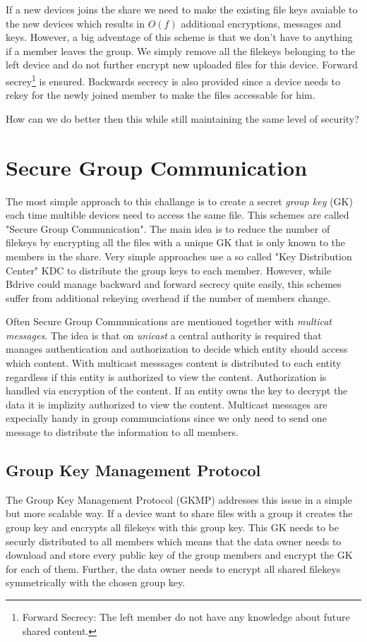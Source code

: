 If a new devices joins the share we need to make the existing file keys avaiable to the new devices which results in $O(f)$ additional encryptions, messages and keys. However, a big adventage of this scheme is that we don't have to anything if a member leaves the group. We simply remove all the filekeys belonging to the left device and do not further encrypt new uploaded files for this device. Forward secrey\footnote{Forward Secrecy: The left member do not have any knowledge about future shared content.} is ensured. Backwards secrecy is also provided since a device needs to rekey for the newly joined member to make the files accessable for him. 

How can we do better then this while still maintaining the same level of security? 


\section{Secure Group Communication}
The most simple approach to this challange is to create a secret \textit{group key} (GK) each time multible devices need to access the same file. This schemes are called "Secure Group Communication". The main idea is to reduce the number of filekeys by encrypting all the files with a unique GK that is only known to the members in the share. Very simple approaches use a so called "Key Distribution Center" KDC to distribute the group keys to each member. However, while Bdrive could manage backward and forward secrecy quite easily, this schemes suffer from additional rekeying overhead if the number of members change. 

Often Secure Group Communications are mentioned together with \textit{multicat messages}. The idea is that on \textit{unicast} a central authority is required that manages authentication and authorization to decide which entity should access which content. With multicast messsages content is distributed to each entity regardless if this entity is authorized to view the content. Authorization is handled via encryption of the content. If an entity owns the key to decrypt the data it is implizity authorized to view the content. Multicast messages are expecially handy in group communciations since we only need to send one message to distribute the information to all members. 

\subsection{Group Key Management Protocol}
The Group Key Management Protocol (GKMP)\cite{harney1997group} addresses this issue in a simple but more scalable way. If a device want to share files with a group it creates the group key and encrypts all filekeys with this group key. This GK needs to be securly distributed to all members which means that the data owner needs to download and store every public key of the group members and encrypt the GK for each of them. Further, the data owner needs to encrypt all shared filekeys symmetrically with the chosen group key. 

